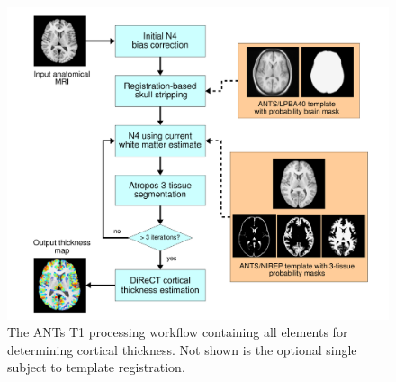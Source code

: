 %
%



\begin{figure}
  \centering
  \includegraphics[width=130mm]{Figures/Kapowski_pipeline.pdf}
  \caption{The ANTs T1 processing workflow containing all elements for 
  determining cortical thickness. Not shown is the optional single subject
  to template registration.}
  \label{fig:pipeline}
\end{figure}

